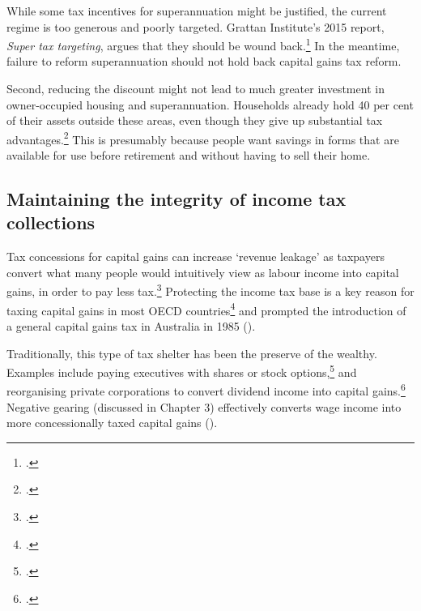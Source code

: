 \documentclass{grattanAlpha}\usepackage[]{graphicx}\usepackage[]{color}
\begin{document}
While some tax incentives for superannuation might be justified, the current regime is too generous and poorly targeted. Grattan Institute’s 2015 report, \textit{Super tax targeting}, argues that they should be wound back.\footcite[][1]{DaleyCoatesWoodEtAl2015Super} In the meantime, failure to reform superannuation should not hold back capital gains tax reform. 

Second, reducing the discount might not lead to much greater investment in owner-occupied housing and superannuation. Households already hold 40 per cent of their assets outside these areas, even though they give up substantial tax advantages.\footcite{ABS2015HousingFinance} This is presumably because people want savings in forms that are available for use before retirement and without having to sell their home.  


\subsection{Maintaining the integrity of income tax collections}
Tax concessions for capital gains can increase ‘revenue leakage’ as taxpayers convert what many people would intuitively view as labour income into capital gains, in order to pay less tax.\footcites{Evans2005}{MinasLim2013} Protecting the income tax base is a key reason for taxing capital gains in most OECD countries\footcite{OECD2006TaxationOfCapitalGains}  and prompted the introduction of a general capital gains tax in Australia in 1985 (). 

Traditionally, this type of tax shelter has been the preserve of the wealthy. Examples include paying executives with shares or stock options,\footcite[][8--9]{Ingles2009TaxEquity} and reorganising private corporations to convert dividend income into capital gains.\footcite{MinasLim2013} Negative gearing (discussed in Chapter 3) effectively converts wage income into more concessionally taxed capital gains ().  
\end{document}
